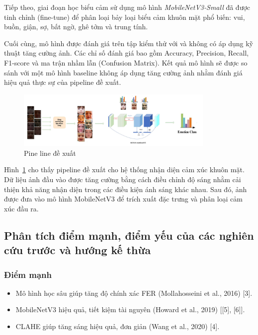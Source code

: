 Tiếp theo, giai đoạn học biểu cảm sử dụng mô hình \textit{MobileNetV3-Small} đã được tinh chỉnh (fine-tune) để phân loại bảy loại biểu cảm khuôn mặt phổ biến: vui, buồn, giận, sợ, bất ngờ, ghê tởm và trung tính.

Cuối cùng, mô hình được đánh giá trên tập kiểm thử với và không có áp dụng kỹ thuật tăng cường ảnh. Các chỉ số đánh giá bao gồm Accuracy, Precision, Recall, F1-score và ma trận nhầm lẫn (Confusion Matrix). Kết quả mô hình sẽ được so sánh với một mô hình baseline không áp dụng tăng cường ảnh nhằm đánh giá hiệu quả thực sự của pipeline đề xuất.


\begin{figure}[H]
    \centering
    \includegraphics[width=0.85\textwidth]{img/pineline.jpg} %
    \caption{Pine line đề xuất}
    \label{fig:pineline}
\end{figure}

Hình~\ref{fig:pineline} cho thấy pipeline đề xuất cho hệ thống nhận diện cảm xúc khuôn mặt. Dữ liệu ảnh đầu vào được tăng cường bằng cách điều chỉnh độ sáng nhằm cải thiện khả năng nhận diện trong các điều kiện ánh sáng khác nhau. Sau đó, ảnh được đưa vào mô hình MobileNetV3 để trích xuất đặc trưng và phân loại cảm xúc đầu ra.

\subsection{Phân tích điểm mạnh, điểm yếu của các nghiên cứu trước và hướng kế thừa}

\subsubsection{Điểm mạnh}
\begin{itemize}
    \item Mô hình học sâu giúp tăng độ chính xác FER (Mollahosseini et al., 2016) [3].
    \item MobileNetV3 hiệu quả, tiết kiệm tài nguyên (Howard et al., 2019) [[5], [6]].
    \item CLAHE giúp tăng sáng hiệu quả, đơn giản (Wang et al., 2020) [4].
\end{itemize}

